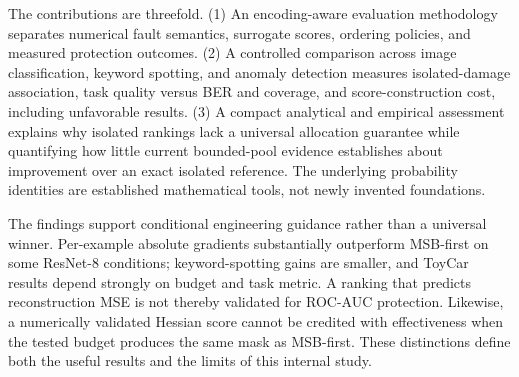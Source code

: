 The contributions are threefold. (1) An encoding-aware evaluation methodology separates numerical fault semantics, surrogate scores, ordering policies, and measured protection outcomes. (2) A controlled comparison across image classification, keyword spotting, and anomaly detection measures isolated-damage association, task quality versus BER and coverage, and score-construction cost, including unfavorable results. (3) A compact analytical and empirical assessment explains why isolated rankings lack a universal allocation guarantee while quantifying how little current bounded-pool evidence establishes about improvement over an exact isolated reference. The underlying probability identities are established mathematical tools, not newly invented foundations.

The findings support conditional engineering guidance rather than a universal winner. Per-example absolute gradients substantially outperform MSB-first on some ResNet-8 conditions; keyword-spotting gains are smaller, and ToyCar results depend strongly on budget and task metric. A ranking that predicts reconstruction MSE is not thereby validated for ROC-AUC protection. Likewise, a numerically validated Hessian score cannot be credited with effectiveness when the tested budget produces the same mask as MSB-first. These distinctions define both the useful results and the limits of this internal study.
